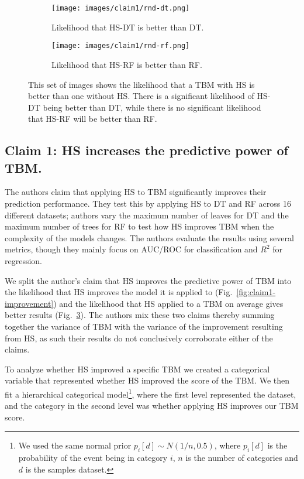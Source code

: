 \begin{figure}[hbt]
     \centering
     \begin{subfigure}[b]{0.43\textwidth}
         \centering
         \texttt{[image: images/claim1/rnd-dt.png]}
         \caption{Likelihood that HS-DT is better than DT.}
         \label{fig:claim1-rnd-dt}
     \end{subfigure}
     \hfill
     \begin{subfigure}[b]{0.43\textwidth}
         \centering
         \texttt{[image: images/claim1/rnd-rf.png]}
         \caption{Likelihood that HS-RF is better than RF.}
         \label{fig:claim1-rnd-rf}
     \end{subfigure}
        \caption{This set of images shows the likelihood that a TBM with HS is better than one without HS. 
        There is a significant likelihood of HS-DT being better than DT, while there is no significant likelihood that HS-RF will be better than RF.}
        \label{fig:claim1-better}
\end{figure}

\subsection{Claim 1: HS increases the predictive power of TBM.}

The authors claim that applying HS to TBM significantly improves their prediction performance. 
They test this by applying HS to DT and RF across 16 different datasets; authors vary the maximum number of leaves for DT and the maximum number of trees for RF to test how HS improves TBM when the complexity of the models changes.
The authors evaluate the results using several metrics, though they mainly focus on AUC/ROC for classification and $R^2$ for regression.

We split the author's claim that HS improves the predictive power of TBM into the likelihood that HS improves the model it is applied to (Fig.~\ref{fig:claim1-improvement}) and the likelihood that HS applied to a TBM on average gives better results (Fig.~\ref{fig:claim1-better}). 
The authors mix these two claims thereby summing together the variance of TBM with the variance of the improvement resulting from HS, as such their results do not conclusively corroborate either of the claims.

To analyze whether HS improved a specific TBM we created a categorical variable that represented whether HS improved the score of the TBM. We then fit a hierarchical categorical model\footnote{\label{fn:prior} We used the same normal prior $p_i[d] \sim N(1/n, 0.5)$, where $p_i[d]$ is the probability of the event being in category $i$, $n$ is the number of categories and $d$ is the samples dataset.}, where the first level represented the dataset, and the category in the second level was whether applying HS improves our TBM score.

